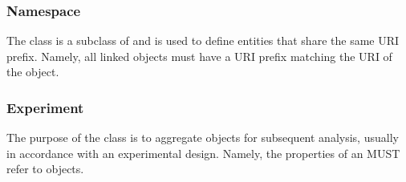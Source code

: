 \subsubsection{Namespace}
\label{sec:Namespace}

The  class is a subclass of  and is used to define  entities that share the same URI prefix.  Namely, all linked objects must have a URI prefix matching the URI of the  object. 

\subsubsection{Experiment}
\label{sec:Experiment}

The purpose of the  class is to aggregate  objects for subsequent analysis, usually in accordance with an experimental design.  Namely, the  properties of an  MUST refer to  objects.

